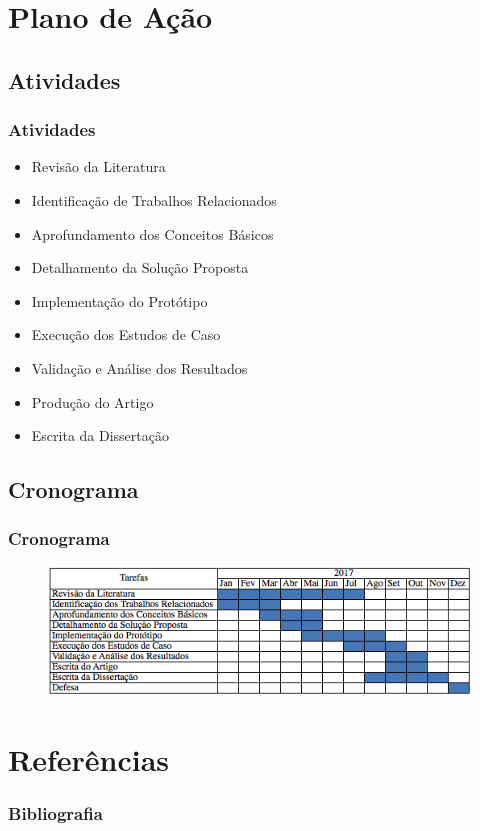 \documentclass[hyperref={pdfpagelabels=false}]{beamer}
\begin{document}
\section{Plano de Ação}

\subsection{Atividades}
\begin{frame}
	\frametitle{Atividades}
    
    \begin{itemize}
	    \item Revisão da Literatura
        \item Identificação de Trabalhos Relacionados
        \item Aprofundamento dos Conceitos Básicos
        \item Detalhamento da Solução Proposta
        \item Implementação do Protótipo
        \item Execução dos Estudos de Caso
        \item Validação e Análise dos Resultados
        \item Produção do Artigo
        \item Escrita da Dissertação
    \end{itemize}
\end{frame}

\subsection{Cronograma}
\begin{frame}
	\frametitle{Cronograma}
		    \begin{figure}
 		   		\centering
	        	\includegraphics[scale=.6]{img/CronogramaDissertacao.png}
   			\end{figure}
 
\end{frame}


\section {Referências}
\begin{frame}[allowframebreaks]
\frametitle{Bibliografia}
    
    \small{  }
\end{frame}
\end{document}
